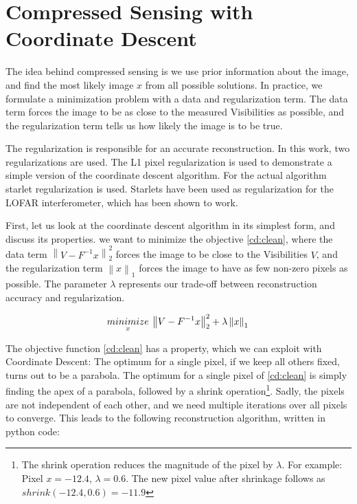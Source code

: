 \section{Compressed Sensing with Coordinate Descent}\label{cd}
The idea behind compressed sensing is we use prior information about the image, and find the most likely image $x$ from all possible solutions. In practice, we formulate a minimization problem with a data and regularization term. The data term forces the image to be as close to the measured Visibilities as possible, and the regularization term tells us how likely the image is to be true. 

The regularization is responsible for an accurate reconstruction. In this work, two regularizations are used. The L1 pixel regularization is used to demonstrate a simple version of the coordinate descent algorithm. For the actual algorithm starlet regularization is used. Starlets have been used as regularization for the LOFAR interferometer\cite{girard2015sparse}, which has been shown to work.

First, let us look at the coordinate descent algorithm in its simplest form, and discuss its properties. we want to minimize the objective \eqref{cd:clean}, where the data term $\left \| V - F^{-1}x \right \|_2^2$ forces the image to be close to the Visibilities $V$, and the regularization term $\left \| x \right \|_1$ forces the image to have as few non-zero pixels as possible. The parameter $\lambda$ represents our trade-off between reconstruction accuracy and regularization. 
 
\begin{equation}\label{cd:clean}
	\underset{x}{minimize} \: \left \| V - F^{-1}x \right \|_2^2 + \lambda \left \| x \right \|_1 \\
\end{equation}

The objective function \eqref{cd:clean} has a property, which we can exploit with Coordinate Descent: The optimum for a single pixel, if we keep all others fixed, turns out to be a parabola. The optimum for a single pixel of \eqref{cd:clean} is simply finding the apex of a parabola, followed by a shrink operation\footnote{The shrink operation reduces the magnitude of the pixel by $\lambda$. For example: Pixel $x = -12.4$, $\lambda = 0.6$. The new pixel value after shrinkage follows as $shrink(-12.4, 0.6) = -11.9$}. Sadly, the pixels are not independent of each other, and we need multiple iterations over all pixels to converge. This leads to the following reconstruction algorithm, written in python code:

